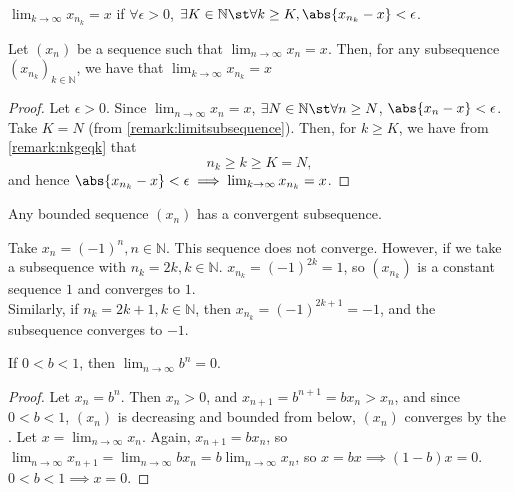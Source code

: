 \documentclass[12pt]{article}
\begin{document}
\begin{remark}\label{remark:limitsubsequence}
  $\lim_{k\to\infty}x_{n_k} = x$ if $\forall \epsilon > 0$, $\exists K \in \mathbb{N} \st \forall k \geq K, \abs{x_{n_k} - x} < \epsilon$.
\end{remark}


\begin{theorem}
  Let $(x_n)$ be a sequence such that $\lim_{n\to\infty} x_n = x$. Then, for any subsequence $(x_{n_k})_{k\in\mathbb{N}}$, we have that $\lim_{k\to\infty} x_{n_k} = x$
\end{theorem}
\begin{proof}
  Let $\epsilon > 0$. Since $\lim_{n\to\infty} x_{n} = x$, $\exists N \in \mathbb{N} \st \forall n \geq N$, $\abs{x_n - x} < \epsilon$. Take $K = N$ (from \cref{remark:limitsubsequence}). Then, for $k \geq K$, we have from \cref{remark:nkgeqk} that $$n_k \geq k \geq K = N,$$ and hence $\abs{x_{n_k} - x} < \epsilon \implies \lim_{k\to\infty}x_{n_k} = x$.
\end{proof}

\begin{theorem}\label{thm:bwthm}\footnotemark
  Any bounded sequence $(x_n)$ has a convergent subsequence.  
  \end{theorem}
\begin{example}
  Take $x_n = (-1)^n, n \in\mathbb{N}$. This sequence does not converge. However, if we take a subsequence with $n_k =2k, k \in\mathbb{N}$. $x_{n_k} = (-1)^{2k} = 1$, so $(x_{n_k})$ is a constant sequence $1$ and converges to $1$.\\ Similarly, if $n_k = 2k+1, k \in \mathbb{N}$, then $x_{n_k} = (-1)^{2k+1} = -1$, and the subsequence converges to $-1$.
\end{example}  

\begin{proposition}\label{prop:prelimfact}
  If $0 < b < 1$, then $\lim_{n\to\infty}b^{n} = 0$.
\end{proposition}
\begin{proof}
  Let $x_n = b^n$. Then $x_n > 0$, and $x_{n+1} = b^{n+1} = b x_{n} > x_n$, and since $ 0 < b < 1$, $(x_n)$ is decreasing and bounded from below, $(x_n)$ converges by the . Let $x = \lim_{n\to\infty}x_n$. Again, $x_{n+1} = b x_n$, so $\lim_{n\to\infty}x_{n+1} = \lim_{n\to\infty}bx_{n} = b\lim_{n\to\infty}x_n$, so $x = bx \implies (1-b)x = 0$. $0 < b < 1 \implies x = 0$.
\end{proof}
\end{document}
